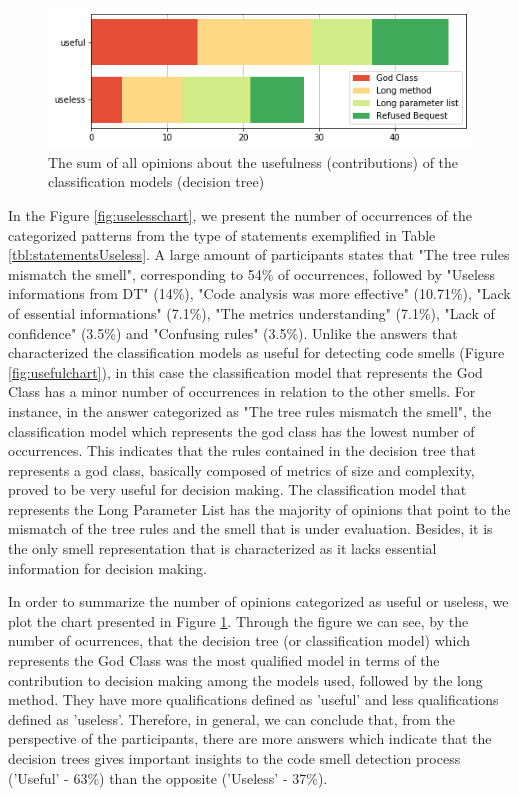 \begin{figure}[t]
\centering
\includegraphics[width=12cm]{figures/useful_useless_total.png}
\caption{The sum of all opinions about the usefulness (contributions) of the classification models (decision tree)}
\label{fig:usefulUselessTotal}
\end{figure}

In the Figure \ref{fig:uselesschart}, we present the number of occurrences of the categorized patterns from the type of statements exemplified in Table \ref{tbl:statementsUseless}.  A large amount of participants states that "The tree rules mismatch the smell", corresponding to 54\% of occurrences, followed by "Useless informations from DT" (14\%), "Code analysis was more effective" (10.71\%), "Lack of essential informations" (7.1\%), "The metrics understanding" (7.1\%), "Lack of confidence" (3.5\%) and "Confusing rules" (3.5\%). Unlike the answers that characterized the classification models as useful for detecting code smells (Figure \ref{fig:usefulchart}), in this case the classification model that represents the God Class has a minor number of occurrences in relation to the other smells. For instance, in the answer categorized as "The tree rules mismatch the smell", the classification model which represents the god class has the lowest number of occurrences. This indicates that the rules contained in the decision tree that represents a god class, basically composed of metrics of size and complexity, proved to be very useful for decision making.  The classification model that represents the Long Parameter List has the majority of opinions that point to the mismatch of the tree rules and the smell that is under evaluation. Besides, it is the only smell representation that is characterized as it lacks essential information for decision making.

In order to summarize the number of opinions categorized as useful or useless, we plot the chart presented in Figure \ref{fig:usefulUselessTotal}. Through the figure we can see, by the number of ocurrences,  that the decision tree (or classification model) which represents the God Class was the most qualified model in terms of the contribution to decision making among the models used, followed by the long method. They have more qualifications defined as 'useful' and less qualifications defined as 'useless'. Therefore, in general, we can conclude that, from the perspective of the participants, there are more answers which indicate that the decision trees gives important insights to the code smell detection process ('Useful' - 63\%) than the opposite ('Useless' - 37\%).










